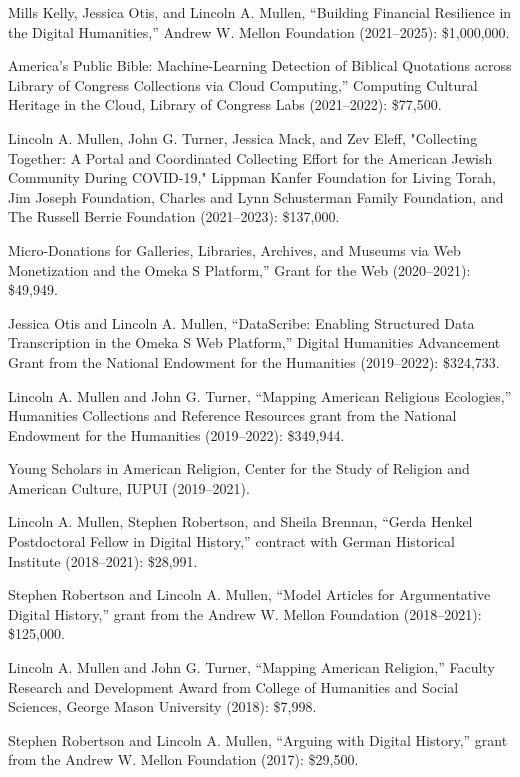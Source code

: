\documentclass[11pt]{article}
\begin{document}
Mills Kelly, Jessica Otis, and Lincoln A. Mullen, ``Building Financial Resilience in the Digital Humanities,'' Andrew W. Mellon Foundation (2021--2025): \$1,000,000.

\noindent{}America's Public Bible: Machine-Learning Detection of Biblical Quotations across Library of Congress Collections via Cloud Computing,'' Computing Cultural Heritage in the Cloud, Library of Congress Labs (2021--2022): \$77,500.

Lincoln A. Mullen, John G. Turner, Jessica Mack, and Zev Eleff, "Collecting Together: A Portal and Coordinated Collecting Effort for the American Jewish Community During COVID-19," Lippman Kanfer Foundation for Living Torah, Jim Joseph Foundation, Charles and Lynn Schusterman Family Foundation, and The Russell Berrie Foundation (2021--2023): \$137,000.

\noindent{}Micro-Donations for Galleries, Libraries, Archives, and Museums via Web Monetization and the Omeka S Platform,'' Grant for the Web (2020--2021): \$49,949.

Jessica Otis and Lincoln A. Mullen, ``DataScribe: Enabling Structured Data Transcription in the Omeka S Web Platform,'' Digital Humanities Advancement Grant from the National Endowment for the Humanities (2019--2022): \$324,733.

Lincoln A. Mullen and John G. Turner, ``Mapping American Religious Ecologies,'' Humanities Collections and Reference Resources grant from the National Endowment for the Humanities (2019--2022): \$349,944.

Young Scholars in American Religion, Center for the Study of Religion and American Culture, IUPUI (2019--2021).

Lincoln A. Mullen, Stephen Robertson, and Sheila Brennan, ``Gerda Henkel Postdoctoral Fellow in Digital History,'' contract with German Historical Institute (2018--2021): \$28,991.

Stephen Robertson and Lincoln A. Mullen, ``Model Articles for Argumentative Digital History,'' grant from the Andrew W. Mellon Foundation (2018--2021): \$125,000.

Lincoln A. Mullen and John G. Turner, ``Mapping American Religion,'' Faculty Research and Development Award from College of Humanities and Social Sciences, George Mason University (2018): \$7,998.

Stephen Robertson and Lincoln A. Mullen, ``Arguing with Digital History,'' grant from the Andrew W. Mellon Foundation (2017): \$29,500.
\end{document}
